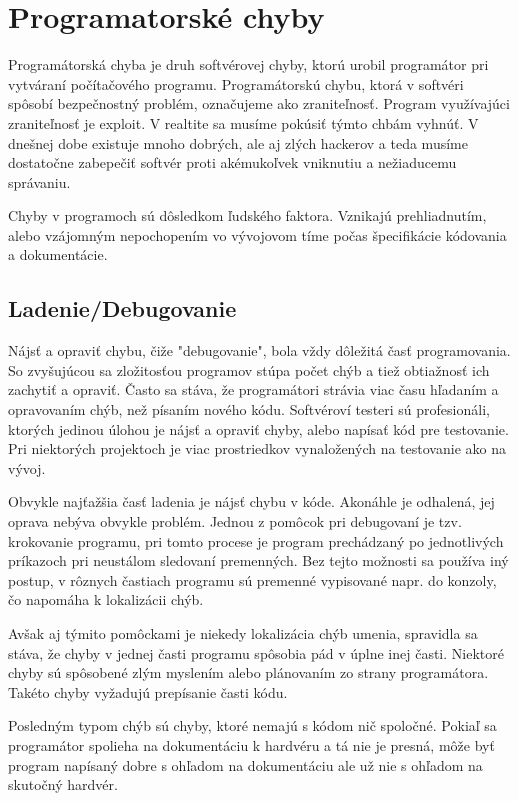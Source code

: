 \documentclass[10pt,twoside,slovak,a4paper]{article}
\begin{document}
\section{Programatorské chyby}
Programátorská chyba je druh softvérovej chyby, ktorú urobil programátor pri vytváraní počítačového programu. Programátorskú chybu, ktorá v softvéri spôsobí bezpečnostný problém, označujeme ako zraniteľnosť. Program využívajúci zraniteľnosť je exploit. V realtite sa musíme pokúsiť týmto chbám vyhnúť. V dnešnej dobe existuje mnoho dobrých, ale aj zlých hackerov a teda musíme dostatočne zabepečiť softvér proti akémukoľvek vniknutiu a nežiaducemu správaniu.

Chyby v programoch sú dôsledkom ľudského faktora. Vznikajú prehliadnutím, alebo vzájomným nepochopením vo vývojovom tíme počas špecifikácie kódovania a dokumentácie.

\subsection{Ladenie/Debugovanie}
Nájsť a opraviť chybu, čiže "debugovanie", bola vždy dôležitá časť programovania. So zvyšujúcou sa zložitosťou programov stúpa počet chýb a tiež obtiažnosť ich zachytiť a opraviť. Často sa stáva, že programátori strávia viac času hľadaním a opravovaním chýb, než písaním nového kódu. Softvéroví testeri sú profesionáli, ktorých jedinou úlohou je nájsť a opraviť chyby, alebo napísať kód pre testovanie. Pri niektorých projektoch je viac prostriedkov vynaložených na testovanie ako na vývoj.

Obvykle najťažšia časť ladenia je nájsť chybu v kóde. Akonáhle je odhalená, jej oprava nebýva obvykle problém. Jednou z pomôcok pri debugovaní je tzv. krokovanie programu, pri tomto procese je program prechádzaný po jednotlivých príkazoch pri neustálom sledovaní premenných. Bez tejto možnosti sa používa iný postup, v rôznych častiach programu sú premenné vypisované napr. do konzoly, čo napomáha k lokalizácii chýb.

Avšak aj týmito pomôckami je niekedy lokalizácia chýb umenia, spravidla sa stáva, že chyby v jednej časti programu spôsobia pád v úplne inej časti.
Niektoré chyby sú spôsobené zlým myslením alebo plánovaním zo strany programátora. Takéto chyby vyžadujú prepísanie časti kódu.

Posledným typom chýb sú chyby, ktoré nemajú s kódom nič spoločné. Pokiaľ sa programátor spolieha na dokumentáciu k hardvéru a tá nie je presná, môže byť program napísaný dobre s ohľadom na dokumentáciu ale už nie s ohľadom na skutočný hardvér.
\end{document}
